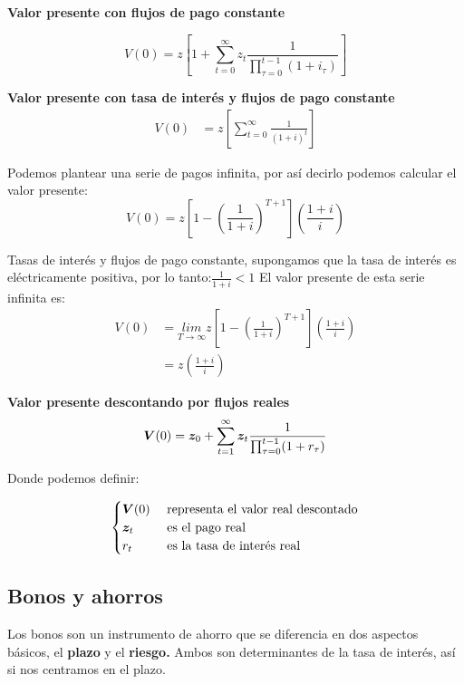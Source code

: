 \textbf{Valor presente con flujos de pago constante}

\begin{equation}
    V(0)=z\left[1+ \sum_{t=0}^{\infty} z_{t}\frac{1}{\prod_{\tau=0}^{t-1}(1+i_{\tau})}\right]
\end{equation}

\textbf{Valor presente con tasa de interés y flujos de pago constante}
\begin{align}
        V(0)&=z\left[\sum_{t=0}^{\infty} \frac{1}{(1+i)^{t}}\right]
\end{align}

Podemos plantear una serie de pagos infinita, por así decirlo podemos calcular el valor presente: 
\begin{equation}
    V(0)=z\left[1-\left(\frac{1}{1+i}\right)^{T+1} \right]\left(\frac{1+i}{i}\right)
\end{equation}

Tasas de interés y flujos de pago constante, supongamos que la tasa de interés es eléctricamente positiva, por lo tanto:$\frac{1}{1+i} < 1$
El valor presente de esta serie infinita es:
\begin{align}
    V(0) &= \underset{T \to \infty}{lim} z \left[1-\left(\frac{1}{1+i}\right)^{T+1}\right]\left(\frac{1+i}{i}\right)  \\
    &= z \left(\frac{1+i}{i}\right) 
\end{align}

\textbf{Valor presente descontando por flujos reales}
\begin{equation}
    {\boldsymbol V}(0)={\boldsymbol z}_{0}+ \sum^{\infty}_{t=1} {\boldsymbol z}_{t}\frac{1}{\prod_{\tau =0}^{t-1}(1+r_{\tau})}
\end{equation}

Donde podemos definir: 

\begin{equation}
    \begin{cases}
    {\boldsymbol V}(0) & \textup{ representa el valor real descontado}\\
    {\boldsymbol z}_{t} & \textup{ es el pago real}\\
    r_{t} & \textup{ es la tasa de interés real}
    \end{cases}
\end{equation}

\subsection{Bonos y ahorros}

Los bonos son un instrumento de ahorro que se diferencia en dos aspectos básicos, el \textbf{plazo} y el \textbf{riesgo.} Ambos son determinantes de la tasa de interés, así si nos centramos en el plazo. 

